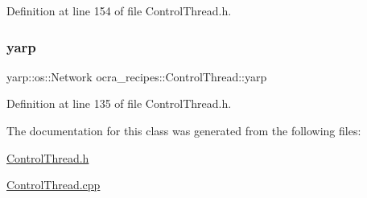Definition at line 154 of file Control\+Thread.\+h.

\hypertarget{classocra__recipes_1_1ControlThread_ab256274135229afc7017b088424b5b3b}{}\label{classocra__recipes_1_1ControlThread_ab256274135229afc7017b088424b5b3b} 
\subsubsection{\texorpdfstring{yarp}{yarp}}
{\footnotesize\ttfamily yarp\+::os\+::\+Network ocra\+\_\+recipes\+::\+Control\+Thread\+::yarp\hspace{0.3cm}{\ttfamily [protected]}}



Definition at line 135 of file Control\+Thread.\+h.



The documentation for this class was generated from the following files\+:\begin{DoxyCompactItemize}
\item 
\hyperlink{ControlThread_8h}{Control\+Thread.\+h}\item 
\hyperlink{ControlThread_8cpp}{Control\+Thread.\+cpp}\end{DoxyCompactItemize}
